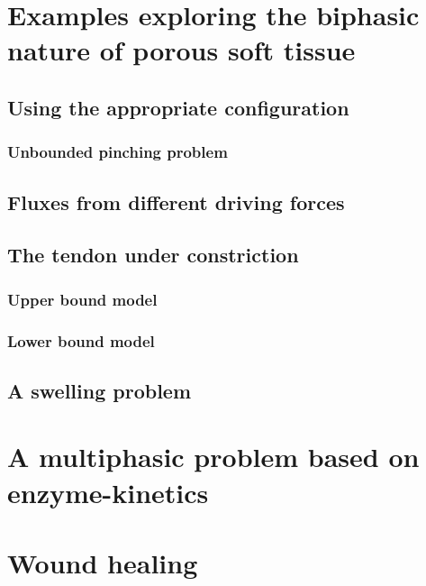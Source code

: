 \section{Examples exploring the biphasic nature of porous soft tissue}
\label{biphasic-examples-1}

\subsection{Using the appropriate configuration}
\label{biphasic-examples-1}

\subsubsection{Unbounded pinching problem}
\label{unbounded-pinching}

\subsection{Fluxes from different driving forces}
\label{flux-driving-forces}

\subsection{The tendon under constriction}
\label{constriction-1}

\subsubsection{Upper bound model}
\label{upper-bound}

\subsubsection{Lower bound model}
\label{lower-bound}

\subsection{A swelling problem}
\label{swelling-1}

\section{A multiphasic problem based on enzyme-kinetics}
\label{enzyme-kinetics}

\section{Wound healing}
\label{wound-healing}
